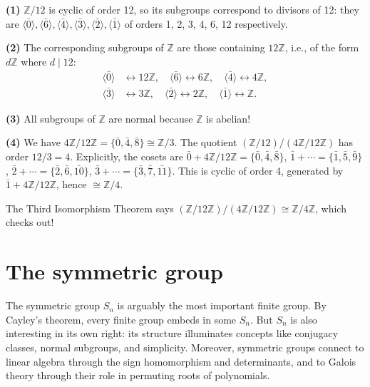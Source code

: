 \documentclass{report}
\begin{document}
\begin{solution}
\textbf{(1)} \(\mathbb{Z}/12\) is cyclic of order 12, so its subgroups correspond to divisors of 12: they are \(\langle \bar{0} \rangle, \langle \bar{6} \rangle, \langle \bar{4} \rangle, \langle \bar{3} \rangle, \langle \bar{2} \rangle, \langle \bar{1} \rangle\) of orders 1, 2, 3, 4, 6, 12 respectively.

\textbf{(2)} The corresponding subgroups of \(\mathbb{Z}\) are those containing \(12\mathbb{Z}\), i.e., of the form \(d\mathbb{Z}\) where \(d \mid 12\): 
\begin{align*}
\langle \bar{0} \rangle &\leftrightarrow 12\mathbb{Z}, \quad \langle \bar{6} \rangle \leftrightarrow 6\mathbb{Z}, \quad \langle \bar{4} \rangle \leftrightarrow 4\mathbb{Z}, \\
\langle \bar{3} \rangle &\leftrightarrow 3\mathbb{Z}, \quad \langle \bar{2} \rangle \leftrightarrow 2\mathbb{Z}, \quad \langle \bar{1} \rangle \leftrightarrow \mathbb{Z}.
\end{align*}

\textbf{(3)} All subgroups of \(\mathbb{Z}\) are normal because \(\mathbb{Z}\) is abelian!

\textbf{(4)} We have \(4\mathbb{Z}/12\mathbb{Z} = \{\bar{0}, \bar{4}, \bar{8}\} \cong \mathbb{Z}/3\). The quotient \((\mathbb{Z}/12)/(4\mathbb{Z}/12\mathbb{Z})\) has order \(12/3 = 4\). Explicitly, the cosets are \(\bar{0} + 4\mathbb{Z}/12\mathbb{Z} = \{\bar{0}, \bar{4}, \bar{8}\}\), \(\bar{1} + \cdots = \{\bar{1}, \bar{5}, \bar{9}\}\), \(\bar{2} + \cdots = \{\bar{2}, \bar{6}, \bar{10}\}\), \(\bar{3} + \cdots = \{\bar{3}, \bar{7}, \bar{11}\}\). This is cyclic of order 4, generated by \(\bar{1} + 4\mathbb{Z}/12\mathbb{Z}\), hence \(\cong \mathbb{Z}/4\).

The Third Isomorphism Theorem says \((\mathbb{Z}/12\mathbb{Z})/(4\mathbb{Z}/12\mathbb{Z}) \cong \mathbb{Z}/4\mathbb{Z}\), which checks out!
\end{solution}

\section{The symmetric group}

The symmetric group \(S_n\) is arguably the most important finite group. By Cayley's theorem, every finite group embeds in some \(S_n\). But \(S_n\) is also interesting in its own right: its structure illuminates concepts like conjugacy classes, normal subgroups, and simplicity. Moreover, symmetric groups connect to linear algebra through the sign homomorphism and determinants, and to Galois theory through their role in permuting roots of polynomials.
\end{document}
